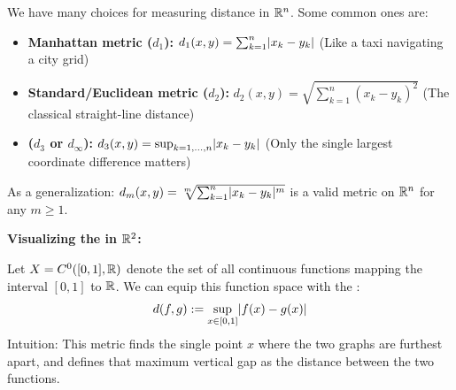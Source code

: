 \begin{example*}[Metrics in $\R^n$]
We have many choices for measuring distance in $\R^n$. Some common ones are:
\begin{itemize}
    \item \textbf{Manhattan metric ($d_1$):} $d_1(x,y) = \sum_{k=1}^n \lvert x_k - y_k\rvert$ \textcolor{eGray}{(Like a taxi navigating a city grid)}
    \item \textbf{Standard/Euclidean metric ($d_2$):} $d_2(x,y) = \sqrt{\sum_{k=1}^n (x_k - y_k)^2}$ \textcolor{eGray}{(The classical straight-line distance)}
    \item \textcolor{eDarkGreen}{} \textbf{($d_3$ or $d_\infty$):} $d_3(x,y) = \sup_{k=1,\dots,n} \lvert x_k - y_k\rvert$ \textcolor{eGray}{(Only the single largest coordinate difference matters)}
\end{itemize}

As a generalization: $d_m(x,y) = \sqrt[m]{\sum_{k=1}^n \lvert x_k - y_k\rvert^m}$ is a valid metric on $\R^n$ for any $m \ge 1$.

\begin{center}
\textbf{Visualizing the  in $\mathbb{R}^2$:} \\
\vspace{0.3cm}
\end{center}
\end{example*}

\begin{example*}
Let $X = C^0([0,1], \mathbb{R})$ denote the set of all continuous functions mapping the interval $[0,1]$ to $\mathbb{R}$. We can equip this function space with the \textcolor{eDarkGreen}{}:
\[ d(f,g) := \sup_{x \in [0,1]} \lvert f(x) - g(x)\rvert \]
\textcolor{eGray}{Intuition: This metric finds the single point $x$ where the two graphs are furthest apart, and defines that maximum vertical gap as the distance between the two functions.}
\end{example*}

